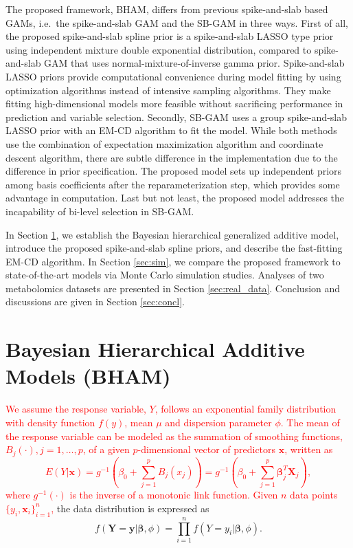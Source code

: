 \documentclass[AMA,STIX1COL,]{WileyNJD-v2}
\begin{document}
The proposed framework, BHAM, differs from previous spike-and-slab based
GAMs, i.e.~the spike-and-slab GAM \citep{Scheipl2012} and the SB-GAM
\citep{Bai2021} in three ways. First of all, the proposed spike-and-slab
spline prior is a spike-and-slab LASSO type prior using independent
mixture double exponential distribution, compared to spike-and-slab GAM
that uses normal-mixture-of-inverse gamma prior. Spike-and-slab LASSO
priors provide computational convenience during model fitting by using
optimization algorithms instead of intensive sampling algorithms. They
make fitting high-dimensional models more feasible without sacrificing
performance in prediction and variable selection. Secondly, SB-GAM uses
a group spike-and-slab LASSO prior with an EM-CD algorithm to fit the
model. While both methods use the combination of expectation
maximization algorithm and coordinate descent algorithm, there are
subtle difference in the implementation due to the difference in prior
specification. The proposed model sets up independent priors among basis
coefficients after the reparameterization step, which provides some
advantage in computation. Last but not least, the proposed model
addresses the incapability of bi-level selection in SB-GAM.

In Section \ref{sec:BHAM}, we establish the Bayesian hierarchical
generalized additive model, introduce the proposed spike-and-slab spline
priors, and describe the fast-fitting EM-CD algorithm. In Section
\ref{sec:sim}, we compare the proposed framework to state-of-the-art
models via Monte Carlo simulation studies. Analyses of two metabolomics
datasets are presented in Section \ref{sec:real_data}. Conclusion and
discussions are given in Section \ref{sec:concl}.

\section{Bayesian Hierarchical Additive Models (BHAM)}
\label{sec:BHAM}

\textcolor{red}{We assume the response variable, $Y$, follows an exponential family distribution with density function $f(y)$, mean $\mu$ and dispersion parameter $\phi$. The mean of the response variable can be modeled as the summation of smoothing functions, $B_j(\cdot), j = 1, \dots, p$, of a given $p$-dimensional vector of predictors $\boldsymbol{x}$, written as 
\begin{equation}\label{eq:gam}
 E(Y|\boldsymbol{x}) = g^{-1}(\beta_0 + \sum\limits^p_{j=1}B_j(x_j)) = g^{-1}(\beta_0 + \sum\limits^p_{j=1} \boldsymbol{\beta}_j^T \boldsymbol{X}_j),
\end{equation}
where $g^{-1}(\cdot)$ is the inverse of a monotonic link function. Given $n$ data points $\{y_i, \boldsymbol{x}_i\}^n_{i=1}$,}
the data distribution is expressed as \begin{equation}
f(\boldsymbol{Y} = \boldsymbol{y}| \boldsymbol{\beta}, \phi) = \prod\limits^n_{i=1}f( Y = y_i|\boldsymbol{\beta}, \phi).\nonumber
\end{equation}
\end{document}
